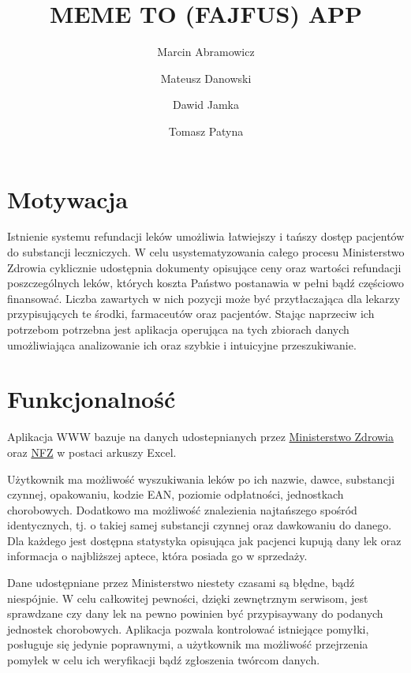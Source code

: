 \documentclass{article}
\title{MEME TO (FAJFUS) APP}
\author{Marcin Abramowicz \and Mateusz Danowski \and Dawid Jamka \and Tomasz Patyna}
\begin{document}
\maketitle


\section{Motywacja}

Istnienie systemu refundacji leków umożliwia łatwiejszy i tańszy dostęp pacjentów do substancji leczniczych. W celu usystematyzowania całego procesu Ministerstwo Zdrowia cyklicznie udostępnia dokumenty opisujące ceny oraz wartości refundacji poszczególnych leków, których koszta Państwo postanawia w pełni bądź częściowo finansować. Liczba zawartych w nich pozycji może być przytłaczająca dla lekarzy przypisujących te środki, farmaceutów oraz pacjentów. Stając naprzeciw ich potrzebom potrzebna jest aplikacja operująca na tych zbiorach danych umożliwiająca analizowanie ich oraz szybkie i intuicyjne przeszukiwanie.


\section{Funkcjonalność}

Aplikacja WWW bazuje na danych udostepnianych przez
\href{https://www.gov.pl/web/zdrowie/obwieszczenia-ministra-zdrowia-lista-lekow-refundowanych?fbclid=IwAR1U3YB3yON5EN2s1qdYRbcIeh7iDxqeOtQoEYGFvX9ozGDWdURIK2JOMRs}
{Ministerstwo Zdrowia}
oraz \href{https://www.nfz.gov.pl/aktualnosci/aktualnosci-centrali/komunikat-dgl,7465.html?fbclid=IwAR0F41XjLwTg7XQdUjeYpE_KS4VVZk50etlbYDpwxhxOR2ZLdslMatUtbEU}{NFZ}
w postaci arkuszy Excel.

Użytkownik ma możliwość wyszukiwania leków po ich nazwie, dawce, substancji czynnej, opakowaniu, kodzie EAN, poziomie odpłatności, jednostkach chorobowych. Dodatkowo ma możliwość znalezienia najtańszego spośród identycznych, tj. o takiej samej substancji czynnej oraz dawkowaniu do danego. Dla każdego jest dostępna statystyka opisująca jak pacjenci kupują dany lek oraz informacja o najbliższej aptece, która posiada go w sprzedaży. 

Dane udostępniane przez Ministerstwo niestety czasami są błędne, bądź niespójnie. W celu całkowitej pewności, dzięki zewnętrznym serwisom, jest sprawdzane czy dany lek na pewno powinien być przypisaywany do podanych jednostek chorobowych. Aplikacja pozwala kontrolować istniejące pomyłki, posługuje się jedynie poprawnymi, a użytkownik ma możliwość przejrzenia pomyłek w celu ich weryfikacji bądź zgłoszenia twórcom danych.
\end{document}
